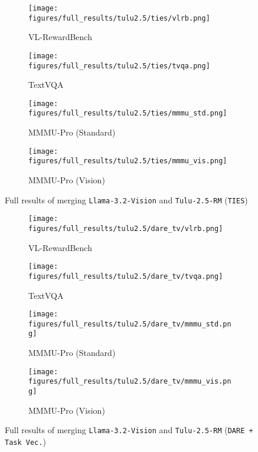 \begin{figure*}[ht]
     \centering
     \begin{subfigure}[b]{0.245\linewidth}
         \centering
         \texttt{[image: figures/full\_results/tulu2.5/ties/vlrb.png]}
         \caption{VL-RewardBench}
     \end{subfigure}
     \hfill
     \begin{subfigure}[b]{0.245\linewidth}
         \centering
         \texttt{[image: figures/full\_results/tulu2.5/ties/tvqa.png]}
         \caption{TextVQA}
     \end{subfigure}
     \hfill
      \begin{subfigure}[b]{0.245\linewidth}
         \centering
         \texttt{[image: figures/full\_results/tulu2.5/ties/mmmu\_std.png]}
         \caption{MMMU-Pro (Standard)}
     \end{subfigure}
     \hfill
     \begin{subfigure}[b]{0.245\linewidth}
         \centering
         \texttt{[image: figures/full\_results/tulu2.5/ties/mmmu\_vis.png]}
         \caption{MMMU-Pro (Vision)}
     \end{subfigure}
        \caption{Full results of merging \texttt{Llama-3.2-Vision} and \texttt{Tulu-2.5-RM} (\texttt{TIES})}
        \vspace{-10pt}
        \label{fig:full_tulu2.5_ties}
\end{figure*}

\begin{figure*}[ht]
     \centering
     \begin{subfigure}[b]{0.245\linewidth}
         \centering
         \texttt{[image: figures/full\_results/tulu2.5/dare\_tv/vlrb.png]}
         \caption{VL-RewardBench}
     \end{subfigure}
     \hfill
     \begin{subfigure}[b]{0.245\linewidth}
         \centering
         \texttt{[image: figures/full\_results/tulu2.5/dare\_tv/tvqa.png]}
         \caption{TextVQA}
     \end{subfigure}
     \hfill
      \begin{subfigure}[b]{0.245\linewidth}
         \centering
         \texttt{[image: figures/full\_results/tulu2.5/dare\_tv/mmmu\_std.png]}
         \caption{MMMU-Pro (Standard)}
     \end{subfigure}
     \hfill
     \begin{subfigure}[b]{0.245\linewidth}
         \centering
         \texttt{[image: figures/full\_results/tulu2.5/dare\_tv/mmmu\_vis.png]}
         \caption{MMMU-Pro (Vision)}
     \end{subfigure}
        \caption{Full results of merging \texttt{Llama-3.2-Vision} and \texttt{Tulu-2.5-RM} (\texttt{DARE + Task Vec.})}
        \vspace{-10pt}
        \label{fig:full_tulu2.5_dare_tv}
\end{figure*}

